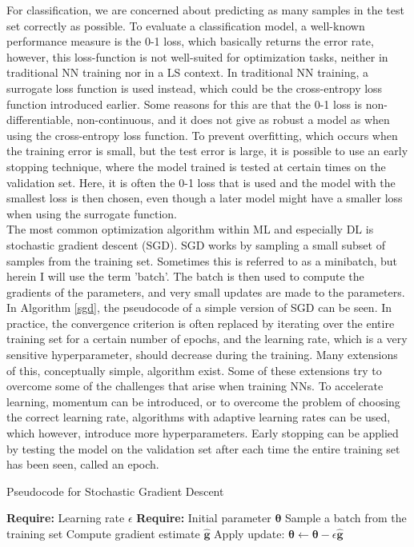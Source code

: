 \noindent For classification, we are concerned about predicting as many samples in the test set correctly as possible. To evaluate a classification model, a well-known performance measure is the 0-1 loss, which basically returns the error rate, however, this loss-function is not well-suited for optimization tasks, neither in traditional NN training nor in a LS context. In traditional NN training, a surrogate loss function is used instead, which could be the cross-entropy loss function introduced earlier. Some reasons for this are that the 0-1 loss is non-differentiable, non-continuous, and it does not give as robust a model as when using the cross-entropy loss function. To prevent overfitting, which occurs when the training error is small, but the test error is large, it is possible to use an early stopping technique, where the model trained is tested at certain times on the validation set. Here, it is often the 0-1 loss that is used and the model with the smallest loss is then chosen, even though a later model might have a smaller loss when using the surrogate function. \\ 

\noindent The most common optimization algorithm within ML and especially DL is stochastic gradient descent (SGD). SGD works by sampling a small subset of samples from the training set. Sometimes this is referred to as a minibatch, but herein I will use the term 'batch'. The batch is then used to compute the gradients of the parameters, and very small updates are made to the parameters. In Algorithm \ref{sgd}, the pseudocode of a simple version of SGD can be seen. In practice, the convergence criterion is often replaced by iterating over the entire training set for a certain number of epochs, and the learning rate, which is a very sensitive hyperparameter, should decrease during the training. Many extensions of this, conceptually simple, algorithm exist. Some of these extensions try to overcome some of the challenges that arise when training NNs. To accelerate learning, momentum can be introduced, or to overcome the problem of choosing the correct learning rate, algorithms with adaptive learning rates can be used, which however, introduce more hyperparameters. Early stopping can be applied by testing the model on the validation set after each time the entire training set has been seen, called an epoch. 

\begin{algorithm}
\caption{Pseudocode for Stochastic Gradient Descent} \label{sgd}
\begin{algorithmic}
    \State \textbf{Require:} Learning rate $\epsilon$ 
    \State \textbf{Require:} Initial parameter $\boldsymbol{\theta}$
        \State Sample a batch from the training set 
        \State Compute gradient estimate $\boldsymbol{\hat{g}}$
        \State Apply update: $\boldsymbol{\theta} \leftarrow \boldsymbol{\theta -} \epsilon \boldsymbol{\hat{g}}$
    \EndWhile
\end{algorithmic}
\end{algorithm}

